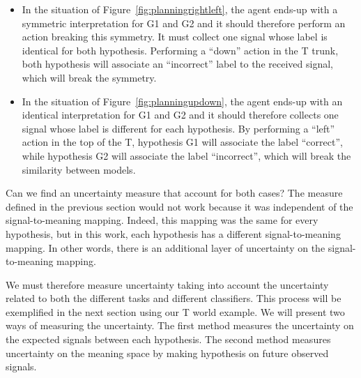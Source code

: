 \begin{itemize}
\item In the situation of Figure~\ref{fig:planningrightleft}, the agent ends-up with a symmetric interpretation for G1 and G2 and it should therefore perform an action breaking this symmetry. It must collect one signal whose label is  identical for both hypothesis. Performing a ``down'' action in the T trunk, both hypothesis will associate an ``incorrect'' label to the received signal, which will break the symmetry.
\item In the situation of Figure~\ref{fig:planningupdown}, the agent ends-up with an identical interpretation for G1 and G2 and it should therefore collects one signal whose label is different for each hypothesis. By performing a ``left'' action in the top of the T, hypothesis G1 will associate the label ``correct'', while hypothesis G2 will associate the label ``incorrect'', which will break the similarity between models.
\end{itemize}

Can we find an uncertainty measure that account for both cases? The measure defined in the previous section would not work because it was independent of the signal-to-meaning mapping. Indeed, this mapping was the same for every hypothesis, but in this work, each hypothesis has a different signal-to-meaning mapping. In other words, there is an additional layer of uncertainty on the signal-to-meaning mapping.


We must therefore measure uncertainty taking into account the uncertainty related to both the different tasks and different classifiers. This process will be exemplified in the next section using our T world example. We will present two ways of measuring the uncertainty. The first method measures the uncertainty on the expected signals between each hypothesis. The second method measures uncertainty on the meaning space by making hypothesis on future observed signals.

